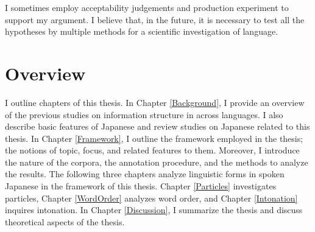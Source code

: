 I sometimes employ acceptability judgements and production experiment
to support my argument.
I believe that, in the future,
it is necessary to test all the hypotheses by multiple methods
for a scientific investigation of language.


\section{Overview}\label{IntroOverview}

I outline chapters of this thesis.
In Chapter \ref{Background},
I provide an overview of the previous studies on information structure in across languages.
I also describe basic features of Japanese and review studies on Japanese related to this thesis.
In Chapter \ref{Framework},
I outline the framework employed in the thesis;
the notions of topic, focus, and related features to them.
Moreover, I introduce the nature of the corpora,
the annotation procedure, and the methods to analyze the results.
The following three chapters analyze linguistic forms in spoken Japanese
in the framework of this thesis.
Chapter \ref{Particles} investigates particles,
Chapter \ref{WordOrder} analyzes word order, and
Chapter \ref{Intonation} inquires intonation.
In Chapter \ref{Discussion},
I summarize the thesis and discuss theoretical aspects of the thesis.

















